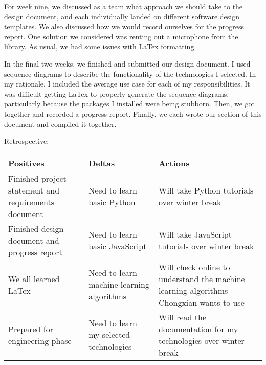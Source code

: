 \documentclass[letterpaper, 10pt,titlepage]{article}
\begin{document}
\par For week nine, we discussed as a team what approach we should take to the design document, and each individually landed on different software design templates. We also discussed how we would record ourselves for the progress report. One solution we considered was renting out a microphone from the library. As usual, we had some issues with LaTex formatting.
\par In the final two weeks, we finished and submitted our design document. I used sequence diagrams to describe the functionality of the technologies I selected. In my rationale, I included the average use case for each of my responsibilities.  It was difficult getting LaTex to properly generate the sequence diagrams, particularly because the packages I installed were being stubborn. Then, we got together and recorded a progress report. Finally, we each wrote our section of this document and compiled it together.


Retrospective:
\begin{center}
    \begin{tabular}{ | l | l | p{3cm} |}
    \hline
    Positives & Deltas & Actions \\ \hline
    Finished project statement and requirements document & Need to learn basic Python & Will take Python tutorials over winter break \\ \hline
    Finished design document and progress report & Need to learn basic JavaScript & Will take JavaScript tutorials over winter break \\ \hline
    We all learned LaTex & Need to learn machine learning algorithms & Will check online to understand the  machine learning algorithms Chongxian wants to use \\ \hline
    Prepared for engineering phase & Need to learn my selected technologies & Will read the documentation for my technologies over winter break \\ \hline
    \end{tabular}
\end{center}
\end{document}
